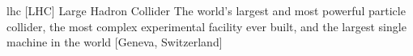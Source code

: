 \newglsXinstitution%
{lhc}%
[LHC]%
{Large Hadron Collider}%
{The world's largest and most powerful particle collider, the most complex experimental facility ever built, and the largest single machine in the world \cite{website:Large_Hadron_Collider}}%
[Geneva, Switzerland]%